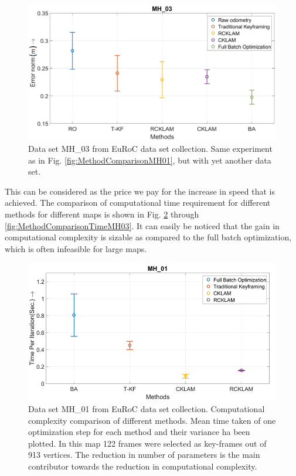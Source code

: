 \begin{figure}
	\centering
		\includegraphics[width=1.00\textwidth]{images/MethodComparisonMH03.png}
  \caption{Data set MH\_03 from EuRoC \cite{Burri25012016} data set collection. Same experiment as in Fig. \ref{fig:MethodComparisonMH01}, but with yet another data set.}
  \label{fig:MethodComparisonMH03}
\end{figure}

This can be considered as the price we pay for the increase in speed that is achieved. The comparison of computational time requirement for different methods for different maps is shown in Fig. \ref{fig:MethodComparisonTimeMH01} through \ref{fig:MethodComparisonTimeMH03}. It can easily be noticed that the gain in computational complexity is sizable as compared to the full batch optimization, which is often infeasible for large maps. 

\begin{figure}
	\centering
		\includegraphics[width=1.00\textwidth]{images/MethodComparisonTimeMH01.png}
  \caption{Data set MH\_01 from EuRoC \cite{Burri25012016} data set collection. Computational complexity comparison of different methods. Mean time taken of one optimization step for each method and their variance ha been plotted. In this map 122 frames were selected as key-frames out of 913 vertices. The reduction in number of parameters is the main contributor towards the reduction in computational complexity.}
  \label{fig:MethodComparisonTimeMH01}
\end{figure}

